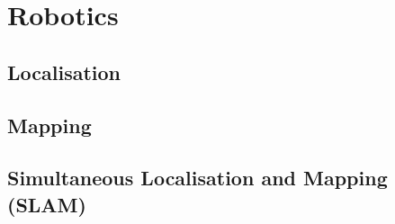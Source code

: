 \section{Robotics}
\subsection{Localisation}
\subsection{Mapping}
\subsection{Simultaneous Localisation and Mapping (SLAM)}